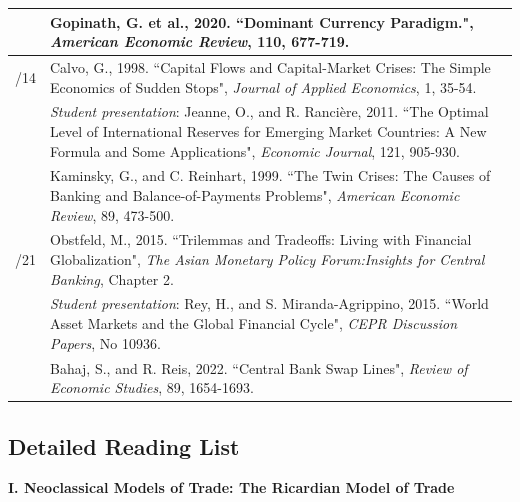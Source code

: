 \documentclass[10pt]{article}
\begin{document}
\begin{table}[h!]
\begin{tabular}{|>{\centering\arraybackslash}p{2.2cm}|>{\raggedright\arraybackslash}p{11.5cm}|}
\cline{2-2}
     & Gopinath, G. et al., 2020. ``Dominant Currency Paradigm.", {\it American Economic Review}, 110, 677-719.\\
\hline
4/14 & Calvo, G., 1998. ``Capital Flows and Capital-Market Crises: The Simple Economics of Sudden Stops", {\it Journal of Applied Economics}, 1, 35-54.\\
\hline
\multirow{2}{*}{4/16} %
     & \textit{Student presentation}:  Jeanne, O., and R. Rancière, 2011. ``The Optimal Level of International Reserves for Emerging Market Countries: A New Formula and Some Applications", {\it Economic Journal}, 121, 905-930.\\
\cline{2-2}
     &  Kaminsky, G., and C. Reinhart, 1999. ``The Twin Crises: The Causes of Banking and Balance-of-Payments Problems", {\it American Economic Review}, 89, 473-500.\\
\hline
4/21 & Obstfeld, M., 2015. ``Trilemmas and Tradeoffs: Living with Financial Globalization", {\it The Asian Monetary Policy Forum:Insights for Central Banking}, Chapter 2.\\
\hline
\multirow{2}{*}{4/23} %
     & \textit{Student presentation}:  Rey, H., and S. Miranda-Agrippino, 2015. ``World Asset Markets and the Global Financial Cycle", {\it CEPR Discussion Papers}, No 10936.\\
\cline{2-2}
     &  Bahaj, S., and R. Reis, 2022. ``Central Bank Swap Lines", {\it Review of Economic Studies}, 89, 1654-1693.\\
\hline
\end{tabular}
\end{table}





\newpage


\subsection*{Detailed Reading List}

\noindent \textbf{I. Neoclassical Models of Trade: The Ricardian Model of Trade}\\[6pt]
\end{document}
